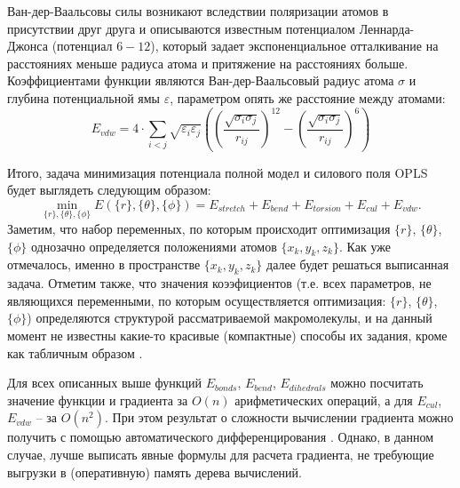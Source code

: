   Ван-дер-Ваальсовы силы возникают вследствии поляризации атомов в присутствии друг друга и описываются известным потенциалом Леннарда-Джонса (потенциал $6-12$), который задает экспоненциальное отталкивание на расстояниях меньше радиуса атома и притяжение на расстояниях больше.
  Коэффициентами функции являются Ван-дер-Ваальсовый радиус атома $\sigma$ и глубина потенциальной ямы $\varepsilon$, параметром опять же расстояние между атомами:
  $$
  E_{vdw} = 4 \cdot \sum_{i < j} \sqrt{\varepsilon_i \varepsilon_j} \left( \left( \frac{\sqrt{\sigma_i \sigma_j}}{r_{ij}} \right)^{12} - \left( \frac{\sqrt{\sigma_i \sigma_j}}{r_{ij}} \right)^{6} \right)
  $$

  Итого, задача минимизация потенциала полной модел и силового поля OPLS будет выглядеть следующим образом:
  $$
  \min_{\{r\},\{\theta\},\{\phi\}} {E(\{r\},\{\theta\},\{\phi\}) = E_{stretch} + E_{bend} + E_{torsion} + E_{cul} + E_{vdw}}.
  $$
  Заметим, что набор переменных, по которым происходит оптимизация $\{r\}$, $\{\theta\}$, $\{\phi\}$ однозачно определяется положениями атомов $\{x_k ,y_k ,z_k\}$. Как уже отмечалось, именно в пространстве $\{x_k ,y_k ,z_k\}$ далее будет решаться выписанная задача. Отметим также, что значения коээфициентов (т.е. всех параметров, не являющихся переменными, по которым осуществляется оптимизация: $\{r\}$, $\{\theta\}$, $\{\phi\}$) определяются структурой рассматриваемой макромолекулы, и на данный момент не известны какие-то красивые (компактные) способы их задания, кроме как табличным образом \cite{Jorgensen1996}.


  Для всех описанных выше функций $E_{bonds}$, $E_{bend}$, $E_{dihedrals}$ можно посчитать значение функции и градиента за ${O}\left( n \right)$ арифметических операций, а для $E_{cul}$, $E_{vdw}$ -- за ${O}\left( n^2 \right)$.
  При этом результат о сложности вычислении градиента можно получить с помощью автоматического дифференцирования \cite{nocedal2006sequential}.
  Однако, в данном случае, лучше выписать явные формулы для расчета градиента, не требующие выгрузки в (оперативную) память дерева вычислений.


